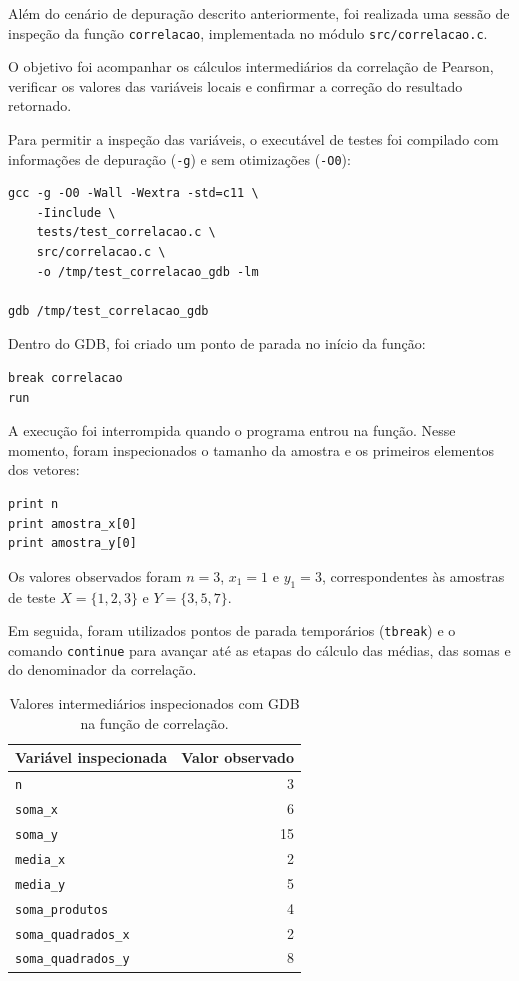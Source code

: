 \documentclass[12pt,a4paper]{article}
\newcommand{\cod}[1]{\texttt{#1}}
\begin{document}
Além do cenário de depuração descrito anteriormente,
foi realizada uma sessão de inspeção da função
\cod{correlacao}, implementada no módulo
\cod{src/correlacao.c}.

O objetivo foi acompanhar os cálculos intermediários da
correlação de Pearson, verificar os valores das variáveis
locais e confirmar a correção do resultado retornado.

Para permitir a inspeção das variáveis, o executável
de testes foi compilado com informações de depuração
(\cod{-g}) e sem otimizações (\cod{-O0}):

\begin{lstlisting}[style=shell]
gcc -g -O0 -Wall -Wextra -std=c11 \
    -Iinclude \
    tests/test_correlacao.c \
    src/correlacao.c \
    -o /tmp/test_correlacao_gdb -lm

gdb /tmp/test_correlacao_gdb
\end{lstlisting}

Dentro do GDB, foi criado um ponto de parada no início
da função:

\begin{lstlisting}
break correlacao
run
\end{lstlisting}

A execução foi interrompida quando o programa entrou
na função. Nesse momento, foram inspecionados o tamanho
da amostra e os primeiros elementos dos vetores:

\begin{lstlisting}
print n
print amostra_x[0]
print amostra_y[0]
\end{lstlisting}

Os valores observados foram $n=3$, $x_1=1$ e $y_1=3$,
correspondentes às amostras de teste
$X=\{1,2,3\}$ e $Y=\{3,5,7\}$.

Em seguida, foram utilizados pontos de parada
temporários (\cod{tbreak}) e o comando \cod{continue}
para avançar até as etapas do cálculo das médias,
das somas e do denominador da correlação.

\begin{table}[h]
\centering
\small
\begin{tabular}{@{}lr@{}}
\toprule
Variável inspecionada & Valor observado \\
\midrule
\cod{n} & 3 \\
\cod{soma\_x} & 6 \\
\cod{soma\_y} & 15 \\
\cod{media\_x} & 2 \\
\cod{media\_y} & 5 \\
\cod{soma\_produtos} & 4 \\
\cod{soma\_quadrados\_x} & 2 \\
\cod{soma\_quadrados\_y} & 8 \\
\bottomrule
\end{tabular}
\caption{Valores intermediários inspecionados com GDB
na função de correlação.}
\end{table}
\end{document}
